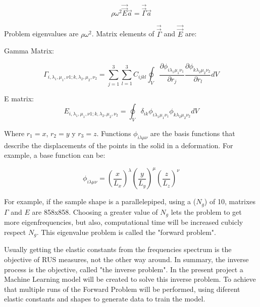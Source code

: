 \documentclass[12pt]{article}
\begin{document}
\begin{equation}
    \rho \omega^2 \vec{\vec{E}} \vec{a} = \vec{\vec{\Gamma}} \vec{a} 
\end{equation}

Problem eigenvalues are $\rho \omega^2$. Matrix elements of $\vec{\vec{\Gamma}}$ and $\vec{\vec{E}}$ are: 

Gamma Matrix: 

\begin{equation}
    \Gamma_{i, \lambda_1, \mu_1,  \nu1; k, \lambda_2, \mu_2, \nu_2} = \sum_{j=1}^{3} \sum_{l=1}^{3} {C_{ijkl} \oint_{V}{\frac{\partial \phi_{i \lambda_{1} \mu_1 \nu_1}}{\partial r_j} \frac{\partial \phi_{k \lambda_2 \mu_2 \nu_2}}{\partial r_l} dV}}
\end{equation}

E matrix:
\begin{equation}
    E_{i, \lambda_1, \mu_1,  \nu1; k, \lambda_2, \mu_2, \nu_2} = \oint_{V}{\delta_{ik} \phi_{i \lambda_1 \mu_1 \nu_1}  \phi_{k \lambda_2 \mu_2 \nu_2} dV}
\end{equation}

Where $r_1 = x$, $r_2 = y$ y  $r_3 = z$. Functions $\phi_{i \lambda \mu \nu}$ are the basis functions that describe the displacements of the points in the solid in a deformation. For example, a base function can be: 

\begin{equation}
    \phi_{i \lambda \mu \nu} = \left(\frac{x}{L_x} \right)^{\lambda} \left(\frac{y}{L_y} \right)^{\mu} \left(\frac{z}{L_z} \right)^{\nu}
\end{equation}

For example, if the sample shape is a parallelepiped, using a ($N_g$) of 10, matrixes $\Gamma$ and $E$ are 858x858. Choosing a greater value of $N_g$ lets the problem to get more eigenfrequencies, but also, computational time will be increased cubicly respect $N_g$. This eigenvalue problem is called the "forward problem".

Usually getting the elastic constants from the frequencies spectrum is the objective of RUS measures, not the other way around. In summary, the inverse process is the objective, called "the inverse problem". In the present project a Machine Learning model will be created to solve this inverse problem. To achieve that multiple runs of the Forward Problem will be performed, using diferent elastic constants and shapes to generate data to train the model.
\end{document}
